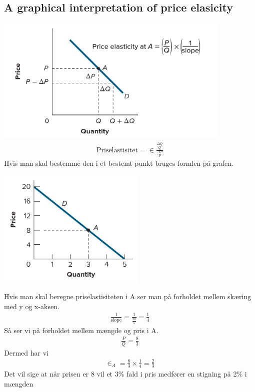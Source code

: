 \subsection{A graphical interpretation of price elasicity}
\includegraphics[scale=0.8]{Afsnit/Lektion1/Elastisitetgraf.png}
\begin{align*}
    \text{Priselastisitet} = \in \frac{\frac{\Delta Q}{Q}}{\frac{\Delta P}{P}}
\end{align*}
Hvis man skal bestemme den i et bestemt punkt bruges formlen på grafen. 
\begin{eks} \textbf{} %
\newline
\includegraphics[scale=0.8]{Afsnit/Lektion1/Elastisiteteks.png}

Hvis man skal beregne priselastisiteten i A ser man på forholdet mellem skæring med y og x-aksen.
\begin{align*}
    \frac{1}{\text{slope}} = \frac{1}{\frac{20}{5}}= \frac{1}{4}
\end{align*}
Så ser vi på forholdet mellem mængde og pris i A.
\begin{align*}
    \frac{P}{Q} = \frac{8}{3}
\end{align*}
Dermed har vi
\begin{align*}
    \in_A = \frac{8}{3} \times \frac{1}{4} = \frac{2}{3}
\end{align*}
Det vil sige at når prisen er 8 vil et 3\% fald i pris medfører en stigning på 2\% i mængden
\end{eks}

